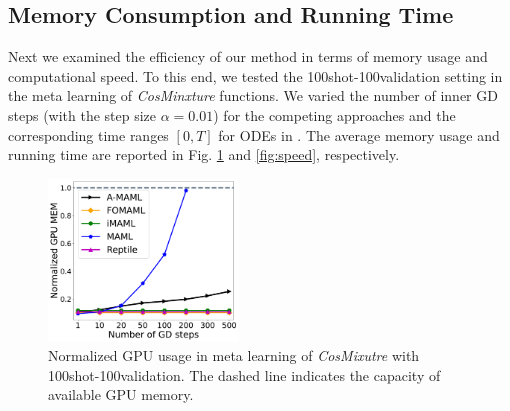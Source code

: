 \subsection{Memory Consumption and Running Time}\label{sect:memory}
\vspace{-0.1in}
Next we examined the efficiency of our method in terms of memory usage and computational speed. To this end, we tested the 100shot-100validation setting in the meta learning of \textit{CosMinxture} functions. We varied the number of inner GD steps (with the step size $\alpha = 0.01$) for the competing approaches and the corresponding time ranges $[0, T]$ for ODEs in \ours. The average memory usage and running time are reported in Fig. \ref{fig:mem-usage} and \ref{fig:speed}, respectively. 
\begin{figure}[!htb]
	\centering
	\includegraphics[width=0.45\textwidth]{./figs/icml22/nGPU-eps-converted-to.pdf}
	\caption{\small Normalized GPU usage in meta learning of \textit{CosMixutre} with 100shot-100validation. The dashed line indicates the capacity of available GPU memory.}
	\label{fig:mem-usage}
	\vspace{-0.1in}
\end{figure}

